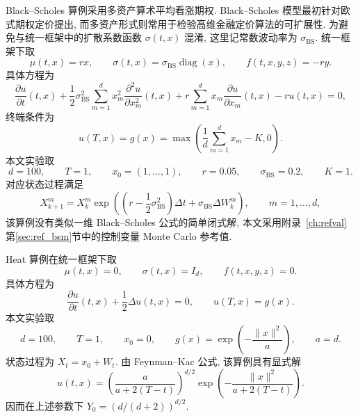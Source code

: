     Black--Scholes 算例采用多资产算术平均看涨期权.
    Black--Scholes 模型最初针对欧式期权定价提出,
    而多资产形式则常用于检验高维金融定价算法的可扩展性\cite{scholesPricingOptionsCorporate,zhaoQuantuminspiredVariationalAlgorithms2024}.
    为避免与统一框架中的扩散系数函数 $\sigma(t,x)$ 混淆, 这里记常数波动率为 $\sigma_{\mathrm{BS}}$.
    统一框架下取
    \begin{equation}
      \mu(t,x)=r x,\qquad
      \sigma(t,x)=\sigma_{\mathrm{BS}}\operatorname{diag}(x),
      \qquad
      f(t,x,y,z)=-r y.
      \label{eq:numerical_bsm_coeff}
    \end{equation}
    具体方程为
    \begin{equation}
      \frac{\partial u}{\partial t}(t,x)
      + \frac{1}{2}\sigma_{\mathrm{BS}}^{2}
        \sum_{m=1}^{d}x_m^2\frac{\partial^2 u}{\partial x_m^2}(t,x)
      + r\sum_{m=1}^{d}x_m\frac{\partial u}{\partial x_m}(t,x)
      - r u(t,x)
      =0,
      \label{eq:numerical_bsm_pde}
    \end{equation}
    终端条件为
    \begin{equation}
      u(T,x)=g(x)=\max\!\left(\frac{1}{d}\sum_{m=1}^{d}x_m-K,0\right).
      \label{eq:numerical_bsm_terminal}
    \end{equation}
    本文实验取
    \begin{equation*}
      d=100,\qquad T=1,\qquad x_0=(1,\ldots,1),\qquad
      r=0.05,\qquad \sigma_{\mathrm{BS}}=0.2,\qquad K=1.
    \end{equation*}
    对应状态过程满足
    \begin{equation}
      X_{k+1}^{m}
      =
      X_k^{m}\exp\!\left((r-\frac{1}{2}\sigma_{\mathrm{BS}}^2)\Delta t
      + \sigma_{\mathrm{BS}} \Delta W_k^{m}\right),
      \qquad m=1,\ldots,d,
      \label{eq:numerical_bsm_forward}
    \end{equation}
    该算例没有类似一维 Black--Scholes 公式的简单闭式解,
    本文采用附录~\ref{ch:refval} 第\ref{sec:ref_bsm}节中的控制变量 Monte Carlo 参考值.

    Heat 算例在统一框架下取
    \begin{equation}
      \mu(t,x)=0,\qquad
      \sigma(t,x)=I_d,\qquad
      f(t,x,y,z)=0.
      \label{eq:numerical_heat_coeff}
    \end{equation}
    具体方程为
    \begin{equation}
      \frac{\partial u}{\partial t}(t,x)
      + \frac{1}{2}\Delta u(t,x)=0,
      \qquad
      u(T,x)=g(x).
      \label{eq:numerical_heat_pde}
    \end{equation}
    本文实验取
    \begin{equation}
      d=100,\qquad T=1,\qquad x_0=0,\qquad
      g(x)=\exp\!\left(-\frac{\lVert x\rVert^2}{a}\right),\qquad a=d.
      \label{eq:numerical_heat_terminal}
    \end{equation}
    状态过程为 $X_t=x_0+W_t$.
    由 Feynman--Kac 公式, 该算例具有显式解
    \begin{equation}
      u(t,x)
      =
      \left(\frac{a}{a+2(T-t)}\right)^{d/2}
      \exp\!\left(
              -\frac{\lVert x\rVert^2}{a+2(T-t)}
      \right).
      \label{eq:numerical_heat_solution_main}
    \end{equation}
    因而在上述参数下 $Y_0=(d/(d+2))^{d/2}$.

